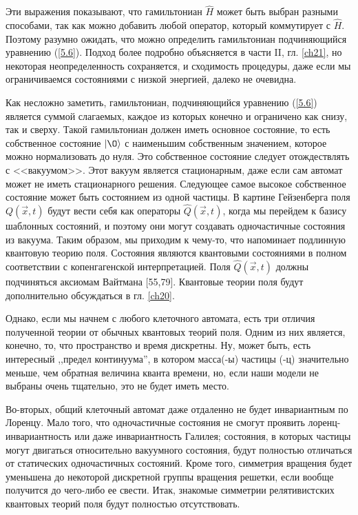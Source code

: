 \documentclass[main.tex]{subfiles}
\begin{document}
Эти выражения показывают, что гамильтониан $\hat H$ может быть выбран разными способами, так как можно добавить любой оператор, который коммутирует с  $\hat H$. Поэтому разумно ожидать, что можно определить гамильтониан подчиняющийся уравнению (\ref{5.6}). Подход более подробно объясняется в части II, гл. \ref{ch21}, но некоторая неопределенность сохраняется, и сходимость процедуры, даже если мы ограничиваемся состояниями с низкой энергией, далеко не очевидна.

Как несложно заметить, гамильтониан, подчиняющийся уравнению (\ref{5.6}) является суммой слагаемых, каждое из которых конечно и ограничено как снизу, так и сверху. Такой гамильтониан должен иметь основное состояние, то есть собственное состояние $|\O\rangle$ с наименьшим собственным значением, которое можно нормализовать до нуля. Это собственное состояние следует отождествлять с <<вакуумом>>. Этот вакуум является стационарным, даже если сам автомат может не иметь стационарного решения. Следующее самое высокое собственное состояние может быть состоянием из одной частицы. В картине Гейзенберга поля $Q (\vec x, t)$ будут вести себя как операторы $\hat Q (\vec x, t)$, когда мы перейдем к базису шаблонных состояний, и поэтому они могут создавать одночастичные состояния из вакуума. Таким образом, мы приходим к чему-то, что напоминает подлинную квантовую теорию поля. Состояния являются квантовыми состояниями в полном соответствии с копенгагенской интерпретацией. Поля $\hat Q (\vec x, t)$ должны подчиняться аксиомам Вайтмана [55,79]. Квантовые теории поля будут дополнительно обсуждаться в гл. \ref{ch20}.

Однако, если мы начнем с любого клеточного автомата, есть три отличия полученной теории от обычных квантовых теорий поля. Одним из них является, конечно, то, что пространство и время дискретны. Ну, может быть, есть интересный ,,предел континуума'', в котором масса(-ы) частицы (-ц) значительно меньше, чем обратная величина кванта времени, но, если наши модели не выбраны очень тщательно, это не будет иметь место.

Во-вторых, общий клеточный автомат даже отдаленно не будет инвариантным по Лоренцу. Мало того, что одночастичные состояния не смогут проявить лоренц-инвариантность или даже инвариантность Галилея; состояния, в которых частицы могут двигаться относительно вакуумного состояния, будут полностью отличаться от статических одночастичных состояний. Кроме того, симметрия вращения будет уменьшена до некоторой дискретной группы вращения решетки, если вообще получится до чего-либо ее свести. Итак, знакомые симметрии релятивистских квантовых теорий поля будут полностью отсутствовать.
\end{document}
